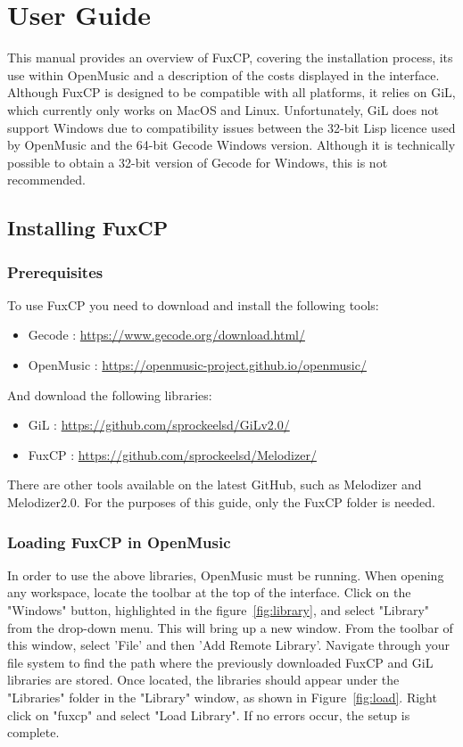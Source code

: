 \chapter{User Guide}\label{chapter:user-guide}
This manual provides an overview of FuxCP, covering the installation process, its use within OpenMusic and a description of the costs displayed in the interface. Although FuxCP is designed to be compatible with all platforms, it relies on GiL, which currently only works on MacOS and Linux. Unfortunately, GiL does not support Windows due to compatibility issues between the 32-bit Lisp licence used by OpenMusic and the 64-bit Gecode Windows version. Although it is technically possible to obtain a 32-bit version of Gecode for Windows, this is not recommended.

\section{Installing FuxCP}
\subsection{Prerequisites}
To use FuxCP you need to download and install the following tools:
\begin{itemize}
    \item Gecode : \url{https://www.gecode.org/download.html/}
    \item OpenMusic : \url{https://openmusic-project.github.io/openmusic/}
\end{itemize}


And download the following libraries:
\begin{itemize}
    \item GiL : \url{https://github.com/sprockeelsd/GiLv2.0/}
    \item FuxCP : \url{https://github.com/sprockeelsd/Melodizer/}
\end{itemize}
There are other tools available on the latest GitHub, such as Melodizer and Melodizer2.0. For the purposes of this guide, only the FuxCP folder is needed.

\subsection{Loading FuxCP in OpenMusic}
In order to use the above libraries, OpenMusic must be running. When opening any workspace, locate the toolbar at the top of the interface. Click on the "Windows" button, highlighted in the figure~\ref{fig:library}, and select "Library" from the drop-down menu. This will bring up a new window. From the toolbar of this window, select 'File' and then 'Add Remote Library'. Navigate through your file system to find the path where the previously downloaded FuxCP and GiL libraries are stored. Once located, the libraries should appear under the "Libraries" folder in the "Library" window, as shown in Figure~\ref{fig:load}. Right click on "fuxcp" and select "Load Library". If no errors occur, the setup is complete.

